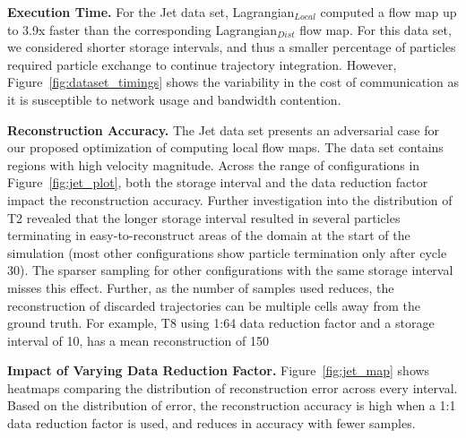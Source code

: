 \textbf{Execution Time.} For the Jet data set, Lagrangian$_{Local}$ computed a flow map up to 3.9x faster than the corresponding Lagrangian$_{Dist}$ flow map.
%
For this data set, we considered shorter storage intervals, and thus a smaller percentage of particles required particle exchange to continue trajectory integration.
%
However, Figure~\ref{fig:dataset_timings} shows the variability in the cost of communication as it is susceptible to network usage and bandwidth contention.
%

\textbf{Reconstruction Accuracy.} The Jet data set presents an adversarial case for our proposed optimization of computing local flow maps.
%
The data set contains regions with high velocity magnitude.
%
Across the range of configurations in Figure~\ref{fig:jet_plot}, both the storage interval and the data reduction factor impact the reconstruction accuracy.
%
Further investigation into the distribution of T2 revealed that the longer storage interval resulted in several particles terminating in easy-to-reconstruct areas of the domain at the start of the simulation (most other configurations show particle termination only after cycle 30).
%
%
The sparser sampling for other configurations with the same storage interval misses this effect.
%
Further, as the number of samples used reduces, the reconstruction of discarded trajectories can be multiple cells away from the ground truth.
%
For example, T8 using 1:64 data reduction factor and a storage interval of 10, has a mean reconstruction of 150%



\textbf{Impact of Varying Data Reduction Factor.} Figure~\ref{fig:jet_map} shows heatmaps comparing the distribution of reconstruction error across every interval.
%
Based on the distribution of error, the reconstruction accuracy is high when a 1:1 data reduction factor is used, and reduces in accuracy with fewer samples.
%
%
%


